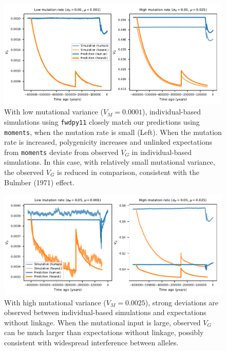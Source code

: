 \documentclass[]{article}
\newcommand{\moments}{\texttt{moments}\xspace}
\newcommand{\fwdpy}{\texttt{fwdpy11}\xspace}
\begin{document}
\begin{figure}[ht!]
    \centering
    \includegraphics{../figures/model_comparison.SD_0.01.mu_0.001_0.025.pdf}
    \caption{
        With low mutational variance ($V_M=0.0001$), individual-based simulations
        using \fwdpy closely match our predictions using \moments, when the
        mutation rate is small (Left). When the mutation rate is increased,
        polygenicity increases and unlinked expectations from \moments deviate
        from observed $V_G$ in individual-based simulations. In this case, with
        relatively small mutational variance, the observed $V_G$ is reduced in
        comparison, consistent with the Bulmber (1971) effect.
    }
    \label{fig:supp-low-VM}
\end{figure}

\begin{figure}[ht!]
    \centering 
    \includegraphics{../figures/model_comparison.SD_0.05.mu_0.001_0.025.pdf}
    \caption{
        With high mutational variance ($V_M=0.0025$), strong deviations are
        observed between individual-based simulations and expectations without
        linkage. When the mutational input is large, observed $V_G$ can be
        much larger than expectations without linkage, possibly consistent with
        widespread interference between alleles.
    }
    \label{fig:supp-high-VM}
\end{figure}
\end{document}
